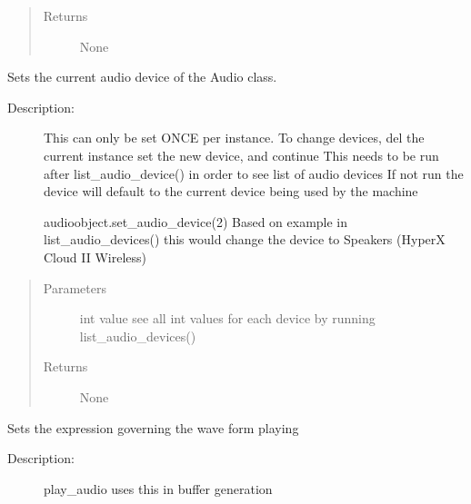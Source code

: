 \documentclass[letterpaper,10pt,english,openany,oneside]{sphinxmanual}
\begin{document}
\begin{fulllineitems}
\begin{fulllineitems}
\begin{quote}
\begin{description}
\item[{Returns}] \leavevmode
\sphinxAtStartPar
None

\end{description}\end{quote}

\end{fulllineitems}



\begin{fulllineitems}
\sphinxAtStartPar
Sets the current audio device of the Audio class.
\begin{description}
\item[{Description:}] \leavevmode
\sphinxAtStartPar
This can only be set ONCE per instance. To change devices, del the current instance
set the new device, and continue
This needs to be run after list\_audio\_device() in order to see list of audio devices
If not run the device will default to the current device being used by the machine

\sphinxAtStartPar
audioobject.set\_audio\_device(2)
Based on example in list\_audio\_devices() this would change the device to Speakers (HyperX Cloud II Wireless)

\end{description}
\begin{quote}\begin{description}
\item[{Parameters}] \leavevmode
\sphinxAtStartPar
{} \textendash{} int value \sphinxhyphen{} see all int values for each device by running list\_audio\_devices()

\item[{Returns}] \leavevmode
\sphinxAtStartPar
None

\end{description}\end{quote}

\end{fulllineitems}



\begin{fulllineitems}
\sphinxAtStartPar
Sets the expression governing the wave form playing
\begin{description}
\item[{Description:}] \leavevmode
\sphinxAtStartPar
play\_audio uses this in buffer generation


\end{description}
\end{fulllineitems}
\end{fulllineitems}
\end{document}
